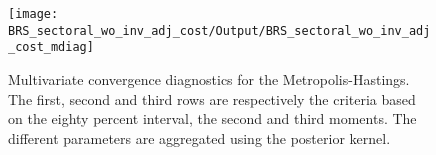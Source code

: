  
\begin{figure}[H]
\centering 
\texttt{[image: BRS\_sectoral\_wo\_inv\_adj\_cost/Output/BRS\_sectoral\_wo\_inv\_adj\_cost\_mdiag]}
\caption{Multivariate convergence diagnostics for the Metropolis-Hastings.
The first, second and third rows are respectively the criteria based on
the eighty percent interval, the second and third moments. The different 
parameters are aggregated using the posterior kernel.}\label{Fig:MultivariateDiagnostics}
\end{figure}

